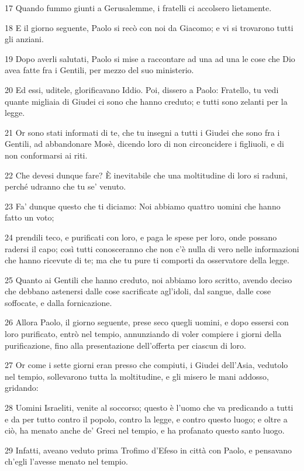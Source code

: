 \par 17 Quando fummo giunti a Gerusalemme, i fratelli ci accolsero lietamente.
\par 18 E il giorno seguente, Paolo si recò con noi da Giacomo; e vi si trovarono tutti gli anziani.
\par 19 Dopo averli salutati, Paolo si mise a raccontare ad una ad una le cose che Dio avea fatte fra i Gentili, per mezzo del suo ministerio.
\par 20 Ed essi, uditele, glorificavano Iddio. Poi, dissero a Paolo: Fratello, tu vedi quante migliaia di Giudei ci sono che hanno creduto; e tutti sono zelanti per la legge.
\par 21 Or sono stati informati di te, che tu insegni a tutti i Giudei che sono fra i Gentili, ad abbandonare Mosè, dicendo loro di non circoncidere i figliuoli, e di non conformarsi ai riti.
\par 22 Che devesi dunque fare? È inevitabile che una moltitudine di loro si raduni, perché udranno che tu se' venuto.
\par 23 Fa' dunque questo che ti diciamo: Noi abbiamo quattro uomini che hanno fatto un voto;
\par 24 prendili teco, e purificati con loro, e paga le spese per loro, onde possano radersi il capo; così tutti conosceranno che non c'è nulla di vero nelle informazioni che hanno ricevute di te; ma che tu pure ti comporti da osservatore della legge.
\par 25 Quanto ai Gentili che hanno creduto, noi abbiamo loro scritto, avendo deciso che debbano astenersi dalle cose sacrificate agl'idoli, dal sangue, dalle cose soffocate, e dalla fornicazione.
\par 26 Allora Paolo, il giorno seguente, prese seco quegli uomini, e dopo essersi con loro purificato, entrò nel tempio, annunziando di voler compiere i giorni della purificazione, fino alla presentazione dell'offerta per ciascun di loro.
\par 27 Or come i sette giorni eran presso che compiuti, i Giudei dell'Asia, vedutolo nel tempio, sollevarono tutta la moltitudine, e gli misero le mani addosso, gridando:
\par 28 Uomini Israeliti, venite al soccorso; questo è l'uomo che va predicando a tutti e da per tutto contro il popolo, contro la legge, e contro questo luogo; e oltre a ciò, ha menato anche de' Greci nel tempio, e ha profanato questo santo luogo.
\par 29 Infatti, aveano veduto prima Trofimo d'Efeso in città con Paolo, e pensavano ch'egli l'avesse menato nel tempio.
